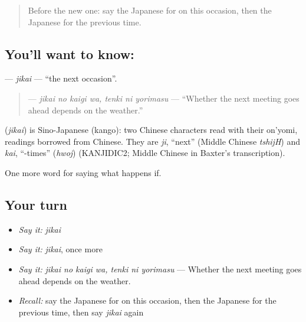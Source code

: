 \label{lesson:JA-C346-jikai}



\begin{quote}
Before the new one: say the Japanese for on this occasion, then the Japanese for the previous time.
\end{quote}

\subsection*{You'll want to know: }
\textbf{} — \emph{jikai} — \textquotedblleft{}the next occasion\textquotedblright{}.

\begin{quote}
\textbf{  } — \emph{jikai no kaigi wa, tenki ni yorimasu} — \textquotedblleft{}Whether the next meeting goes ahead depends on the weather.\textquotedblright{}
\end{quote}

\begin{cousinweb}
\textbf{} (\emph{jikai}) is Sino-Japanese (kango): two Chinese characters read with their on'yomi, readings borrowed from Chinese. They are \emph{ji}, \textquotedblleft{}next\textquotedblright{} (Middle Chinese \emph{tshijH}) and \emph{kai}, \textquotedblleft{}-times\textquotedblright{} (\emph{hwoj}) (KANJIDIC2; Middle Chinese in Baxter's transcription).
\end{cousinweb}

\begin{grammarlens}[title={What you've built}]
One more word for saying what happens if.
\end{grammarlens}

\subsection*{Your turn}
\begin{itemize}
\raggedright
  \item \emph{Say it:} \emph{jikai}
  \item \emph{Say it:} \emph{jikai}, once more
  \item \emph{Say it:} \emph{jikai no kaigi wa, tenki ni yorimasu} — Whether the next meeting goes ahead depends on the weather.
  \item \emph{Recall:} say the Japanese for on this occasion, then the Japanese for the previous time, then say \emph{jikai} again
\end{itemize}

